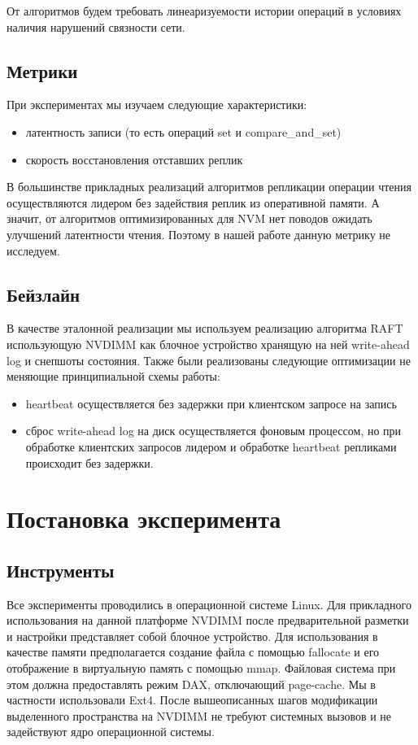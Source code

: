 \documentclass[pdftex,ptm,12pt,a4paper]{report}
\theoremstyle{definition}
\begin{document}
От алгоритмов будем требовать линеаризуемости \cite{linearizability} истории операций в условиях наличия нарушений связности сети.

\section{Метрики}
При экспериментах мы изучаем следующие характеристики:
\begin{itemize}
    \item латентность записи (то есть операций set и compare\_and\_set)
    \item скорость восстановления отставших реплик
\end{itemize}

В большинстве прикладных реализаций алгоритмов репликации операции чтения осуществляются лидером без задействия реплик из оперативной памяти.
А значит, от алгоритмов оптимизированных для NVM нет поводов ожидать улучшений латентности чтения. Поэтому в нашей работе данную метрику не исследуем.

\section{Бейзлайн}
В качестве эталонной реализации мы используем реализацию алгоритма RAFT \cite{raftpaper} использующую NVDIMM как блочное устройство
хранящую на ней write-ahead log и снепшоты состояния.
Также были реализованы следующие оптимизации не меняющие принципиальной схемы работы:
\begin{itemize}
\item heartbeat осуществляется без задержки при клиентском запросе на запись
\item сброс write-ahead log на диск осуществляется фоновым процессом, но при обработке клиентских запросов лидером и обработке heartbeat репликами происходит без задержки.
\end{itemize}

\chapter{Постановка эксперимента}
\section{Инструменты}
Все эксперименты проводились в операционной системе Linux.  Для прикладного использования на данной платформе NVDIMM
после предварительной разметки и настройки представляет собой блочное устройство. Для использования в качестве памяти предполагается создание файла с помощью fallocate
и его отображение в виртуальную память с помощью mmap. Файловая система при этом должна предоставлять режим DAX, отключающий page-cache. Мы в частности использовали Ext4.
После вышеописанных шагов модификации выделенного пространства на NVDIMM не требуют системных вызовов и не задействуют ядро операционной системы.
\end{document}
